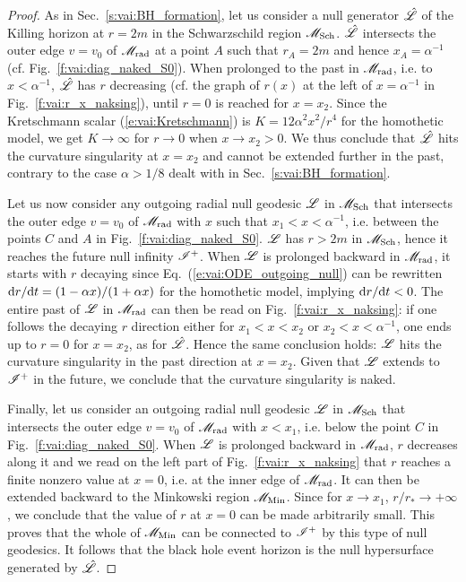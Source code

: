 \begin{proof}
As in Sec.~\ref{s:vai:BH_formation}, let us consider a null generator
$\hat{\mathscr{L}}$ of the Killing horizon at $r=2m$ in the Schwarzschild region
$\mathscr{M}_{\rm Sch}$.
$\hat{\mathscr{L}}$ intersects the outer edge $v=v_0$ of $\mathscr{M}_{\rm rad}$ at a
point $A$ such that $r_A=2m$ and hence $x_A=\alpha^{-1}$ (cf. Fig.~\ref{f:vai:diag_naked_S0}). When
prolonged to the past in $\mathscr{M}_{\rm rad}$, i.e. to $x < \alpha^{-1}$,
$\hat{\mathscr{L}}$ has $r$ decreasing (cf. the graph of $r(x)$ at the left of
$x=\alpha^{-1}$ in Fig.~\ref{f:vai:r_x_naksing}), until $r=0$ is reached for
$x=x_2$. Since the Kretschmann scalar (\ref{e:vai:Kretschmann}) is
$K = 12 \alpha^2 x^2 / r^4$ for the homothetic model, we get $K\to \infty$
for $r\to 0$ when $x\to x_2 > 0$. We thus conclude that $\hat{\mathscr{L}}$ hits
the curvature singularity at $x=x_2$ and cannot be extended further in the
past, contrary to the case $\alpha > 1/8$ dealt with in Sec.~\ref{s:vai:BH_formation}.

Let us now consider any outgoing radial null geodesic $\mathscr{L}$ in $\mathscr{M}_{\rm Sch}$
that intersects the outer edge $v=v_0$ of $\mathscr{M}_{\rm rad}$ with
$x$ such that $x_1 < x < \alpha^{-1}$, i.e. between the points $C$ and $A$
in Fig.~\ref{f:vai:diag_naked_S0}. $\mathscr{L}$ has $r> 2m$ in $\mathscr{M}_{\rm Sch}$,
hence it reaches the future null infinity $\mathscr{I}^+$. When $\mathscr{L}$
is prolonged backward in $\mathscr{M}_{\rm rad}$, it starts with
$r$ decaying since
Eq.~(\ref{e:vai:ODE_outgoing_null}) can be rewritten $\mathrm{d} r/\mathrm{d} t = (1 - \alpha x)/(1 + \alpha x)$
for the homothetic model, implying $\mathrm{d} r / \mathrm{d} t <0$. The entire past of $\mathscr{L}$ in $\mathscr{M}_{\rm rad}$ can then be read on Fig.~\ref{f:vai:r_x_naksing}: if one
follows the decaying $r$ direction either for $x_1 < x < x_2$ or $x_2 < x < \alpha^{-1}$,
one ends up to $r=0$ for $x=x_2$, as for $\hat{\mathscr{L}}$. Hence the same conclusion holds:
$\mathscr{L}$ hits the curvature singularity in the past direction at $x=x_2$.
Given that $\mathscr{L}$ extends to $\mathscr{I}^+$ in the future, we conclude that
the curvature singularity is naked.

Finally, let us consider an outgoing radial null geodesic $\mathscr{L}$ in $\mathscr{M}_{\rm Sch}$ that intersects the outer edge $v=v_0$ of $\mathscr{M}_{\rm rad}$ with
$x < x_1$, i.e. below the point $C$ in Fig.~\ref{f:vai:diag_naked_S0}. When $\mathscr{L}$ is prolonged backward in $\mathscr{M}_{\rm rad}$, $r$ decreases along it
and we read on the left part of Fig.~\ref{f:vai:r_x_naksing} that $r$ reaches
a finite nonzero value at $x=0$, i.e. at the inner edge of $\mathscr{M}_{\rm rad}$. It can then be extended backward to the Minkowski region $\mathscr{M}_{\rm Min}$.
Since for $x\to x_1$, $r/r_*\to +\infty$, we conclude that the value of $r$
at $x=0$ can be made arbitrarily small. This proves that the whole of $\mathscr{M}_{\rm Min}$ can be connected to $\mathscr{I}^+$ by this type of null geodesics. It follows
that the black hole event horizon is the null hypersurface generated by $\hat{\mathscr{L}}$.
\end{proof}

